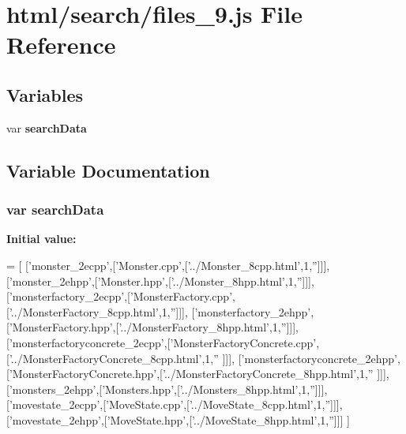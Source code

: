 \section{html/search/files\-\_\-9.js File Reference}
\label{files__9_8js}
\subsection*{Variables}
\begin{DoxyCompactItemize}
\item 
var {\bf search\-Data}
\end{DoxyCompactItemize}


\subsection{Variable Documentation}
\subsubsection[{search\-Data}]{\setlength{\rightskip}{0pt plus 5cm}var search\-Data}\label{files__9_8js_ad01a7523f103d6242ef9b0451861231e}
{\bfseries Initial value\-:}
\begin{DoxyCode}
=
[
  [\textcolor{stringliteral}{'monster\_2ecpp'},[\textcolor{stringliteral}{'Monster.cpp'},[\textcolor{stringliteral}{'../Monster\_8cpp.html'},1,\textcolor{stringliteral}{''}]]],
  [\textcolor{stringliteral}{'monster\_2ehpp'},[\textcolor{stringliteral}{'Monster.hpp'},[\textcolor{stringliteral}{'../Monster\_8hpp.html'},1,\textcolor{stringliteral}{''}]]],
  [\textcolor{stringliteral}{'monsterfactory\_2ecpp'},[\textcolor{stringliteral}{'MonsterFactory.cpp'},[\textcolor{stringliteral}{'../MonsterFactory\_8cpp.html'},1,\textcolor{stringliteral}{''}]]],
  [\textcolor{stringliteral}{'monsterfactory\_2ehpp'},[\textcolor{stringliteral}{'MonsterFactory.hpp'},[\textcolor{stringliteral}{'../MonsterFactory\_8hpp.html'},1,\textcolor{stringliteral}{''}]]],
  [\textcolor{stringliteral}{'monsterfactoryconcrete\_2ecpp'},[\textcolor{stringliteral}{'MonsterFactoryConcrete.cpp'},[\textcolor{stringliteral}{'../MonsterFactoryConcrete\_8cpp.html'},1,\textcolor{stringliteral}{''}
      ]]],
  [\textcolor{stringliteral}{'monsterfactoryconcrete\_2ehpp'},[\textcolor{stringliteral}{'MonsterFactoryConcrete.hpp'},[\textcolor{stringliteral}{'../MonsterFactoryConcrete\_8hpp.html'},1,\textcolor{stringliteral}{''}
      ]]],
  [\textcolor{stringliteral}{'monsters\_2ehpp'},[\textcolor{stringliteral}{'Monsters.hpp'},[\textcolor{stringliteral}{'../Monsters\_8hpp.html'},1,\textcolor{stringliteral}{''}]]],
  [\textcolor{stringliteral}{'movestate\_2ecpp'},[\textcolor{stringliteral}{'MoveState.cpp'},[\textcolor{stringliteral}{'../MoveState\_8cpp.html'},1,\textcolor{stringliteral}{''}]]],
  [\textcolor{stringliteral}{'movestate\_2ehpp'},[\textcolor{stringliteral}{'MoveState.hpp'},[\textcolor{stringliteral}{'../MoveState\_8hpp.html'},1,\textcolor{stringliteral}{''}]]]
]
\end{DoxyCode}
